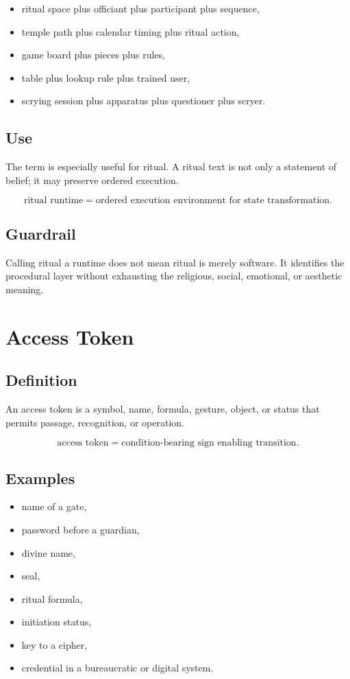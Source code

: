 \documentclass[11pt]{book}
\begin{document}
\begin{itemize}
    \item ritual space plus officiant plus participant plus sequence,
    \item temple path plus calendar timing plus ritual action,
    \item game board plus pieces plus rules,
    \item table plus lookup rule plus trained user,
    \item scrying session plus apparatus plus questioner plus scryer.
\end{itemize}

\subsection*{Use}

The term is especially useful for ritual. A ritual text is not only a statement of belief; it may preserve ordered execution.

\[
\text{ritual runtime} = \text{ordered execution environment for state transformation}.
\]

\subsection*{Guardrail}

Calling ritual a runtime does not mean ritual is merely software. It identifies the procedural layer without exhausting the religious, social, emotional, or aesthetic meaning.

\section{Access Token}

\subsection*{Definition}

An access token is a symbol, name, formula, gesture, object, or status that permits passage, recognition, or operation.

\[
\text{access token} = \text{condition-bearing sign enabling transition}.
\]

\subsection*{Examples}

\begin{itemize}
    \item name of a gate,
    \item password before a guardian,
    \item divine name,
    \item seal,
    \item ritual formula,
    \item initiation status,
    \item key to a cipher,
    \item credential in a bureaucratic or digital system.
\end{itemize}
\end{document}
